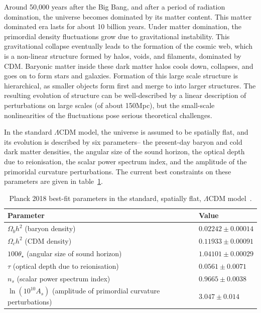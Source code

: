 Around 50,000 years after the Big Bang, and after a period of radiation domination, the universe becomes dominated by its matter content. This matter dominated era lasts for about 10 billion years. Under matter domination, the primordial density fluctuations grow due to gravitational instability. This gravitational collapse eventually leads to the formation of the cosmic web, which is a non-linear structure formed by halos, voids, and filaments, dominated by CDM.  Baryonic matter inside these dark matter halos cools down, collapses, and goes on to form stars and galaxies. Formation of this large scale structure is hierarchical, as smaller objects form first and merge to into larger structures. The resulting evolution of structure can be well-described by a linear description of perturbations on large scales (of about 150Mpc), but the small-scale nonlinearities of the fluctuations pose serious theoretical challenges.

In the standard $\Lambda$CDM model, the universe is assumed to be spatially flat, and its evolution is described by six parameters-- the present-day baryon and cold dark matter densities, the angular size of the sound horizon, the optical depth due to reionisation, the scalar power spectrum index, and the amplitude of the primoridal curvature perturbations. The current best constraints on these parameters are given in table~\ref{tab:planck2018params}.

\begin{table}[ht]
	\centering
\begin{tabular}{ l | l}
	\textbf{Parameter} & \textbf{Value} \\
	\hline
	$\Omega_b h^2$ (baryon density) & $0.02242 \pm 0.00014$ \\
	$\Omega_c h^2$ (CDM density) & $0.11933 \pm 0.00091$ \\
	$100 \theta_\star$ (angular size of sound horizon) & $1.04101 \pm 0.00029$ \\
	$\tau$ (optical depth due to reionisation) & $0.0561 \pm 0.0071$ \\
	$n_s$ (scalar power spectrum index) & $0.9665 \pm 0.0038$ \\
	$\ln (10^{10} A_s)$ (amplitude of primordial curvature perturbations) & $3.047 \pm 0.014$
\end{tabular}
	\caption{Planck 2018 best-fit parameters in the standard, spatially flat, $\Lambda$CDM model~\cite{Aghanim:2018eyx}.} \label{tab:planck2018params}
\end{table}

